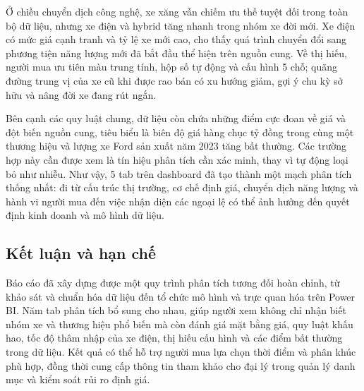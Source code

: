 Ở chiều chuyển dịch công nghệ, xe xăng vẫn chiếm ưu thế tuyệt đối trong toàn bộ dữ liệu, nhưng xe điện và hybrid tăng nhanh trong nhóm xe đời mới. Xe điện có mức giá cạnh tranh và tỷ lệ xe mới cao, cho thấy quá trình chuyển đổi sang phương tiện năng lượng mới đã bắt đầu thể hiện trên nguồn cung. Về thị hiếu, người mua ưu tiên màu trung tính, hộp số tự động và cấu hình 5 chỗ; quãng đường trung vị của xe cũ khi được rao bán có xu hướng giảm, gợi ý chu kỳ sở hữu và nâng đời xe đang rút ngắn.

Bên cạnh các quy luật chung, dữ liệu còn chứa những điểm cực đoan về giá và đột biến nguồn cung, tiêu biểu là biên độ giá hàng chục tỷ đồng trong cùng một thương hiệu và lượng xe Ford sản xuất năm 2023 tăng bất thường. Các trường hợp này cần được xem là tín hiệu phân tích cần xác minh, thay vì tự động loại bỏ như nhiễu. Như vậy, 5 tab trên dashboard đã tạo thành một mạch phân tích thống nhất: đi từ cấu trúc thị trường, cơ chế định giá, chuyển dịch năng lượng và hành vi người mua đến việc nhận diện các ngoại lệ có thể ảnh hưởng đến quyết định kinh doanh và mô hình dữ liệu.

\subsection{Kết luận và hạn chế}

Báo cáo đã xây dựng được một quy trình phân tích tương đối hoàn chỉnh, từ khảo sát và chuẩn hóa dữ liệu đến tổ chức mô hình và trực quan hóa trên Power BI. Năm tab phân tích bổ sung cho nhau, giúp người xem không chỉ nhận biết nhóm xe và thương hiệu phổ biến mà còn đánh giá mặt bằng giá, quy luật khấu hao, tốc độ thâm nhập của xe điện, thị hiếu cấu hình và các điểm bất thường trong dữ liệu. Kết quả có thể hỗ trợ người mua lựa chọn thời điểm và phân khúc phù hợp, đồng thời cung cấp thông tin tham khảo cho đại lý trong quản lý danh mục và kiểm soát rủi ro định giá.

